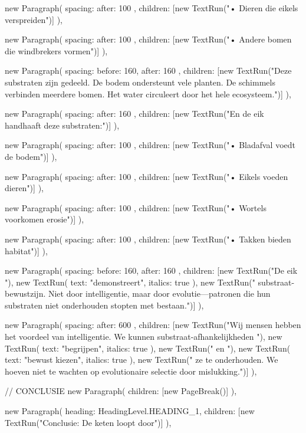 {{      new Paragraph({
        spacing: { after: 100 },
        children: [new TextRun("• Dieren die eikels verspreiden")]
      }),

      new Paragraph({
        spacing: { after: 100 },
        children: [new TextRun("• Andere bomen die windbrekers vormen")]
      }),

      new Paragraph({
        spacing: { before: 160, after: 160 },
        children: [new TextRun("Deze substraten zijn gedeeld. De bodem ondersteunt vele planten. De schimmels verbinden meerdere bomen. Het water circuleert door het hele ecosysteem.")]
      }),

      new Paragraph({
        spacing: { after: 160 },
        children: [new TextRun("En de eik handhaaft deze substraten:")]
      }),

      new Paragraph({
        spacing: { after: 100 },
        children: [new TextRun("• Bladafval voedt de bodem")]
      }),

      new Paragraph({
        spacing: { after: 100 },
        children: [new TextRun("• Eikels voeden dieren")]
      }),

      new Paragraph({
        spacing: { after: 100 },
        children: [new TextRun("• Wortels voorkomen erosie")]
      }),

      new Paragraph({
        spacing: { after: 100 },
        children: [new TextRun("• Takken bieden habitat")]
      }),

      new Paragraph({
        spacing: { before: 160, after: 160 },
        children: [new TextRun("De eik "), new TextRun({ text: "demonstreert", italics: true }), new TextRun(" substraat-bewustzijn. Niet door intelligentie, maar door evolutie—patronen die hun substraten niet onderhouden stopten met bestaan.")]
      }),

      new Paragraph({
        spacing: { after: 600 },
        children: [new TextRun("Wij mensen hebben het voordeel van intelligentie. We kunnen substraat-afhankelijkheden "), new TextRun({ text: "begrijpen", italics: true }), new TextRun(" en "), new TextRun({ text: "bewust kiezen", italics: true }), new TextRun(" ze te onderhouden. We hoeven niet te wachten op evolutionaire selectie door mislukking.")]
      }),

      // CONCLUSIE
      new Paragraph({ children: [new PageBreak()] }),

      new Paragraph({
        heading: HeadingLevel.HEADING_1,
        children: [new TextRun("Conclusie: De keten loopt door")]
      }),

}}
